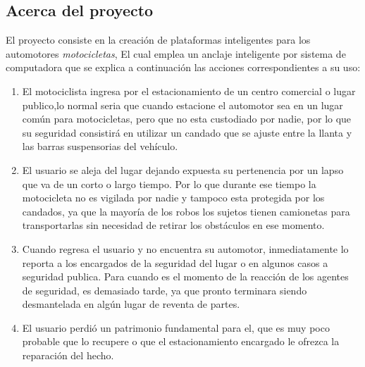 \documentclass[11pt]{article}
\begin{document}
\subsection{Acerca del proyecto}
El proyecto consiste en la creación de plataformas inteligentes para los automotores \emph{motocicletas}, El cual emplea un anclaje inteligente por sistema de computadora que se explica a continuación las acciones correspondientes a su uso:
\begin{enumerate}
	\item El motociclista ingresa por el estacionamiento de un centro comercial o lugar publico,lo normal seria que cuando estacione el automotor sea en un lugar común para motocicletas, pero que no esta custodiado por nadie, por lo que su seguridad consistirá en utilizar un candado que se ajuste entre la llanta y las barras suspensorias del vehículo.
	\item El usuario se aleja del lugar dejando expuesta su pertenencia por un lapso que va de un corto o largo tiempo. Por lo que durante ese tiempo la motocicleta no es vigilada por nadie y tampoco esta protegida por los candados, ya que la mayoría de los robos los sujetos tienen camionetas para transportarlas sin necesidad de retirar los obstáculos en ese momento.
	\item Cuando regresa el usuario y no encuentra su automotor, inmediatamente lo reporta a los encargados de la seguridad del lugar o en algunos casos a seguridad publica. Para cuando es el momento de la reacción de los agentes de seguridad, es demasiado tarde, ya que pronto terminara siendo desmantelada en algún lugar de reventa de partes.
	\item El usuario perdió un patrimonio fundamental para el, que es muy poco probable que lo recupere o que el estacionamiento encargado le ofrezca la reparación del hecho.   
\end{enumerate}
\end{document}
